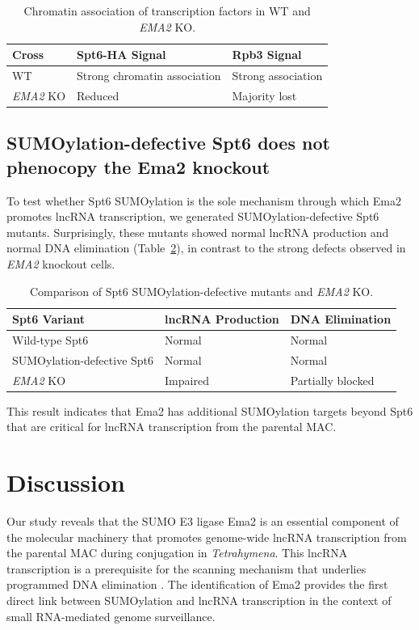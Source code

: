 \documentclass[11pt,a4paper]{article}
\begin{document}
\begin{table}[htbp]
\centering
\caption{Chromatin association of transcription factors in WT and \textit{EMA2} KO.}
\label{tab:chromatin}
\begin{tabular}{lll}
\toprule
\textbf{Cross} & \textbf{Spt6-HA Signal} & \textbf{Rpb3 Signal} \\
\midrule
WT & Strong chromatin association & Strong association \\
\textit{EMA2} KO & Reduced & Majority lost \\
\bottomrule
\end{tabular}
\end{table}

\subsection{SUMOylation-defective Spt6 does not phenocopy the Ema2 knockout}

To test whether Spt6 SUMOylation is the sole mechanism through which Ema2 promotes lncRNA transcription, we generated SUMOylation-defective Spt6 mutants. Surprisingly, these mutants showed normal lncRNA production and normal DNA elimination (Table~\ref{tab:spt6mut}), in contrast to the strong defects observed in \textit{EMA2} knockout cells.

\begin{table}[htbp]
\centering
\caption{Comparison of Spt6 SUMOylation-defective mutants and \textit{EMA2} KO.}
\label{tab:spt6mut}
\begin{tabular}{lll}
\toprule
\textbf{Spt6 Variant} & \textbf{lncRNA Production} & \textbf{DNA Elimination} \\
\midrule
Wild-type Spt6 & Normal & Normal \\
SUMOylation-defective Spt6 & Normal & Normal \\
\textit{EMA2} KO & Impaired & Partially blocked \\
\bottomrule
\end{tabular}
\end{table}

This result indicates that Ema2 has additional SUMOylation targets beyond Spt6 that are critical for lncRNA transcription from the parental MAC.

\section{Discussion}

Our study reveals that the SUMO E3 ligase Ema2 is an essential component of the molecular machinery that promotes genome-wide lncRNA transcription from the parental MAC during conjugation in \textit{Tetrahymena}. This lncRNA transcription is a prerequisite for the scanning mechanism that underlies programmed DNA elimination \citep{Mochizuki2002, Noto2015}. The identification of Ema2 provides the first direct link between SUMOylation and lncRNA transcription in the context of small RNA-mediated genome surveillance.
\end{document}
